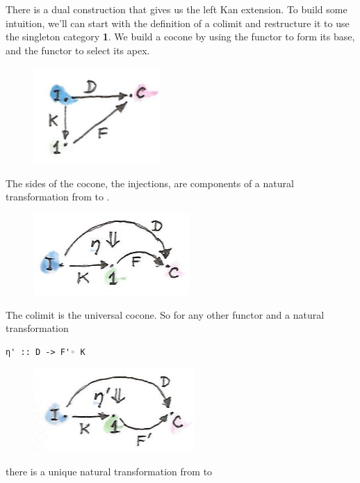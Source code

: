 There is a dual construction that gives us the left Kan extension. To
build some intuition, we'll can start with the definition of a colimit
and restructure it to use the singleton category \textbf{1}. We build a
cocone by using the functor  to form its
base, and the functor  to select its apex.

\begin{figure}[H]
\centering
\includegraphics[width=1.90625in]{images/kan81.jpg}
\end{figure}

\noindent
The sides of the cocone, the injections, are components of a natural
transformation  from  to .

\begin{figure}[H]
\centering
\includegraphics[width=2.33333in]{images/kan10a.jpg}
\end{figure}

\noindent
The colimit is the universal cocone. So for any other functor
 and a natural transformation

\begin{verbatim}
η' :: D -> F'◦ K
\end{verbatim}

\begin{figure}[H]
\centering
\includegraphics[width=2.40625in]{images/kan10b.jpg}
\end{figure}

\noindent
there is a unique natural transformation  from  to

